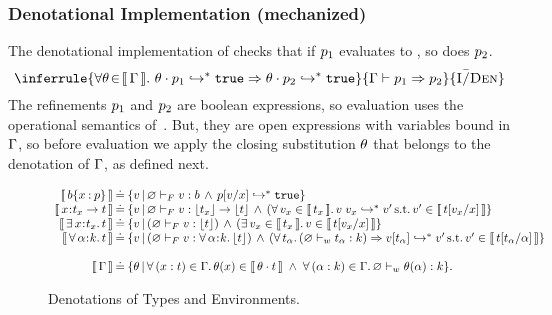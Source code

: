 \subsubsection{Denotational Implementation (mechanized)}
\label{sec:typing:implication:denotational}
The denotational implementation of 
checks that if $p_1$ evaluates to \ttrue, so does $p_2$. 
%
$$
  \inferrule
  { \forall \clsub\!\in\!\denote{\tcenv}. \
      \evalsTo{\applysubst{\clsub}{\spred_1}}{\ttrue}
      \Rightarrow 
      \evalsTo{\applysubst{\clsub}{\spred_2}}{\ttrue}
  }
  {\imply{\tcenv}{\spred_1}{\spred_2}}
  {\iDen}
$$
The refinements $p_1$ and $p_2$ are boolean expressions, 
so evaluation uses the operational semantics of~\Cref{fig:opsem}. 
But, they are open expressions with variables bound in $\mathrm{\Gamma}$,
so before evaluation we apply the closing substitution $\theta$
that belongs to the denotation of $\mathrm{\Gamma}$, as defined next. 

\begin{figure}
$$\begin{array}{r@{\hskip 0.03in}c@{\hskip 0.03in}l}
\denote{\breft{\sbase}{x}{p}} & \defeq &
  \setcomp{\sval}{\hasftype{\varnothing}{\sval}{\sbase} \,\wedge\, \evalsTo{\subst{p}{x}{\sval}}{\ttrue}} \\
\denote{\functype{x}{\stype_x}{\stype}} & \defeq &
  \setcomp{\sval}{\hasftype{\varnothing}{\sval}{\funcftype{\forgetreft{\stype_x}}{\forgetreft{\stype}}} \,\wedge\, (\forall\, \sval_x \in \denote{\stype_x}.\, \evalsTo{\app{\sval}{\sval_x}}{\sval'} \,{\rm s.t.}\, \sval' \in \denote{\subst{\stype}{x}{\sval_x}} }  \\
\denote{\existype{x}{\stype_x}{\stype}} & \defeq &
  \setcomp{\sval}{(\hasftype{\varnothing}{\sval}{\forgetreft{\stype}}) \,\wedge\,
    ( \exists\, \sval_x \in \denote{\stype_x}.\, \sval\in \denote{\subst{\stype}{x}{\sval_x}} }   \\
\denote{\polytype{\al}{\skind}{\stype}} & \defeq &
  \setcomp{\sval}{(\hasftype{\varnothing}{\sval}{\polytype{\al}{\skind}{\forgetreft{\stype}}}) \,\wedge\,
    (\forall\, \stype_\al.\, (\isWellFormed{\varnothing}{\stype_\al}{\skind}) \Rightarrow
    \evalsTo{\tyapp{\sval}{\stype_\al}}{\sval'}
    \,{\rm s.t.}\, \sval' \in \denote{\subst{\stype}{\al}{\stype_\al}}} \\ \\ 
\denote{\tcenv} & \defeq &
\setcomp{\clsub} %
{\forall\, (x:t) \in \tcenv.\, \clsub(x) \in \denote{\applysubst{\clsub}{t}} \;\wedge\;
\forall\, (\al:k) \in \tcenv.\, \isWellFormed{\varnothing}{\clsub(\al)}{k}}.
\end{array}$$
\vspace{-0.0cm}
\caption{Denotations of Types and Environments.}
\label{fig:den}
\vspace{-0.0cm}
\end{figure}

